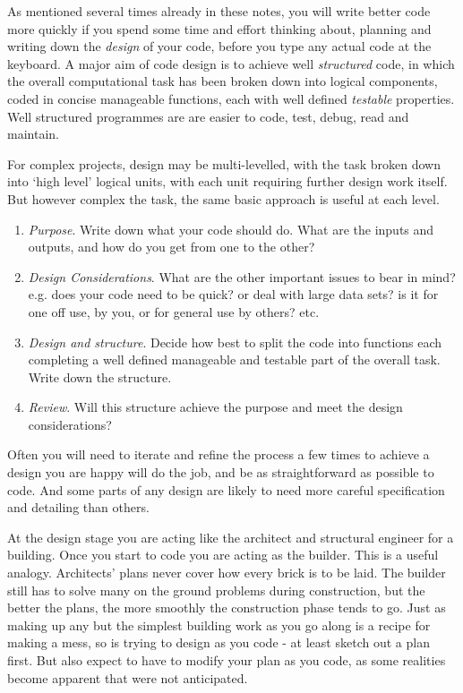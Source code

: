\documentclass[10pt] {article}
\theoremstyle{definition}
\begin{document}
As mentioned several times already in these notes, you will write better code more quickly if you spend some time and effort thinking about, planning and writing down the {\em design} of your code, before you type any actual code at the keyboard. A major aim of code design is to achieve well {\em structured} code, in which the overall computational task has been broken down into logical components, coded in concise manageable functions, each with well defined {\em testable} properties. Well structured programmes are are easier to code, test, debug, read and maintain. 

For complex projects, design may be multi-levelled, with the task broken down into `high level' logical units, with each unit requiring further design work itself. But however complex the task, the same basic approach is useful at each level.
\begin{enumerate}
\item {\em Purpose}. Write down what your code should do. What are the inputs and outputs, and how do you get from one to the other?
\item {\em Design Considerations}. What are the other important issues to bear in mind? e.g. does your code need to be quick? or deal with large data sets? is it for one off use, by you, or for general use by others? etc.
\item  {\em Design and structure}. Decide how best to split the code into functions each completing a well defined manageable and testable part of the overall task. Write down the structure.
\item {\em Review}. Will this structure achieve the purpose and meet the design considerations?  
\end{enumerate} 
Often you will need to iterate and refine the process a few times to achieve a design you are happy will do the job, and be as straightforward as possible to code. And some parts of any design are likely to need more careful specification and detailing than others. 

At the design stage you are acting like the architect and structural engineer for a building. Once you start to code you are acting as the builder. This is a useful analogy. Architects' plans never cover how every brick is to be laid. The builder still has to solve many on the ground problems during construction, but the better the plans, the more smoothly the construction phase tends to go. Just as making up any but the simplest building work as you go along is a recipe for making a mess, so is trying to design as you code - at least sketch out a plan first. But also expect to have to modify your plan as you code, as some realities become apparent that were not anticipated. 
\end{document}
